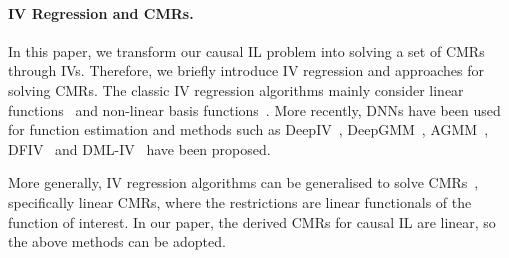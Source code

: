 \vspace{-4pt}
\paragraph{IV Regression and CMRs.} 
In this paper, we transform our causal IL problem into solving a set of CMRs through IVs. Therefore, we briefly introduce IV regression and approaches for solving CMRs. The classic IV regression algorithms mainly consider linear functions~\citep{Angrist1996} and non-linear basis functions~\citep{Newey2003,Chen2018,Singh2019}. More recently, DNNs have been used for function estimation and methods such as DeepIV~\citep{Hartford2017DeepPrediction}, DeepGMM~\citep{Bennett2019DeepAnalysis}, AGMM~\citep{Dikkala2020}, DFIV~\citep{Xu2020} and DML-IV~\citep{Shao2024} have been proposed.

More generally, IV regression algorithms can be generalised to solve CMRs~\citep{Liao2020,Dikkala2020,Shao2024}, specifically linear CMRs, where the restrictions are linear functionals of the function of interest. In our paper, the derived CMRs for causal IL are linear, so the above methods can be adopted.